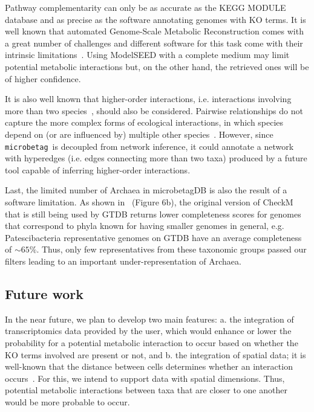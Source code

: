 \documentclass[sn-mathphys,Numbered]{sn-jnl}  %
\theoremstyle{thmstyleone}%
\theoremstyle{thmstyletwo}%
\theoremstyle{thmstylethree}%
\newcommand{\microbetag}{\texttt{microbetag}}
\begin{document}
        Pathway complementarity can only be as accurate as the KEGG MODULE database and as precise as  the software annotating genomes with KO terms.
        It is well known that automated Genome-Scale Metabolic Reconstruction comes with a great number of challenges and different software for this task come with their intrinsic limitations~\cite{mendoza2019systematic}. 
        Using ModelSEED with a complete medium may limit potential metabolic interactions but, on the other hand, the retrieved ones will be of higher confidence.

        It is also well known that higher-order interactions, i.e. interactions involving more than two species~\cite{zelezniak2015metabolic}, should also be considered.
        Pairwise relationships do not capture the more complex forms of ecological interactions, in which species depend on (or are influenced by) multiple other species~\cite{faust2012microbialReviewInteractions}.
        However, since \microbetag~\space is decoupled from network inference, it could annotate a network with hyperedges (i.e. edges connecting more than two taxa) produced by a future tool capable of inferring higher-order interactions.

        Last, the limited number of Archaea in microbetagDB is also the result of a software limitation.
        As shown in~\cite{chklovski2023checkm2} (Figure 6b), the original version of CheckM~\cite{parks2015checkm} that is still being used by GTDB returns lower completeness scores for genomes that correspond to phyla known for having smaller genomes in general, 
        e.g. Patescibacteria representative genomes on GTDB have an average completeness of $\sim 65\%$.
        Thus, only few representatives from these taxonomic groups passed our filters leading to an important under-representation of Archaea.


    \subsection*{Future work}
    \label{subsec:future}

        In the near future, we plan to develop two main features: 
        a. the integration of transcriptomics data provided by the user, which would enhance or lower the probability for a potential metabolic interaction to occur based on whether the KO terms involved are present or not, and 
        b. the integration of spatial data; it is well-known that 
        the distance between cells 
        determines whether an 
        interaction occurs~\cite{dal2020short}.
        For this, we intend to support data with 
        spatial dimensions. 
        Thus, potential metabolic interactions between taxa that are closer to one another would be more probable to occur.
\end{document}

